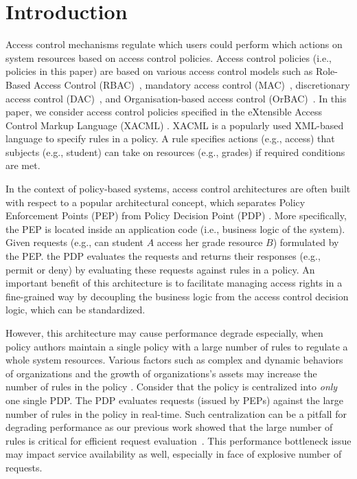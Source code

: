 
\section{Introduction} \label{sec:introduction}

Access control mechanisms regulate which users
could perform which actions on system resources based on access control policies.
Access control policies (i.e., policies in this paper) are based on various access control models such as Role-Based Access Control (RBAC)~\cite{ferraiolo:rbac}, mandatory access control (MAC)~\cite{mac}, discretionary access control (DAC)~\cite{dac}, and Organisation-based access control (OrBAC)~\cite{orbac}.
In this paper, we consider access control policies specified in 
the eXtensible Access Control Markup Language (XACML) \cite{sunxacml}. XACML is a popularly used XML-based language to specify rules 
in a policy. A rule specifies actions (e.g., access) that subjects (e.g., student) can take on resources (e.g., grades) if required conditions are met.

In the context of policy-based systems, access control architectures are often built with respect to a popular
architectural concept, which separates Policy Enforcement Points (PEP) from Policy Decision Point (PDP) \cite{separation}. More specifically, the PEP is located inside an application code (i.e., business logic of the system).
Given requests (e.g., can student $A$ access her grade resource $B$) formulated by the PEP. the PDP evaluates the requests and returns their responses (e.g., permit or deny) by evaluating these requests 
against rules in a policy. An important benefit of this architecture is to facilitate managing access rights in a fine-grained way by 
decoupling the business logic from the access control decision logic, which can be standardized. 

However, this architecture may cause performance degrade
especially, when policy authors maintain a single policy with a large number of rules to regulate a whole system resources.
Various factors such as complex and dynamic behaviors of organizations and the growth of organizations's assets may increase the 
number of rules in the policy \cite{policymanagement}. 
Consider that the policy is centralized into \emph{only} one single PDP.
The PDP evaluates requests (issued by PEPs) against
the large number of rules in the policy in real-time.
Such centralization can be a pitfall for degrading performance as our previous work showed that the large number of rules is critical for efficient request evaluation~\cite{Xengine}.
This performance bottleneck issue may impact service 
availability as well, especially in face of explosive number of requests.



